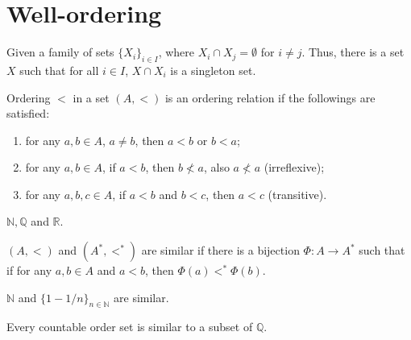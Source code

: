 \section{Well-ordering}
\begin{theorem}
Given a family of sets $\{X_i\}_{i \in I}$, where $X_i \cap X_j = \emptyset$ for $i \neq j$. Thus, there is a set $X$ such that for all $i \in I$, $X \cap X_i$ is a singleton set.
\end{theorem}

\medskip

\begin{definition}
Ordering $<$ in a set $(A, <)$ is an ordering relation if the followings are satisfied:
\begin{enumerate}[label=(\alph*)]
    \item for any $a, b \in A$, $a \neq b$, then $a < b$ or $b < a$;
    
    \item for any $a, b \in A$, if $a < b$, then $b \nless a$, also $a \nless a$ (irreflexive);
    
    \item for any $a, b, c \in A$, if $a < b$ and $b < c$, then $a < c$ (transitive).
\end{enumerate}
\end{definition}

\medskip

\begin{example}
$\mathbb{N}, \mathbb{Q}$ and $\mathbb{R}$.
\end{example}

\medskip

\begin{definition}
$(A, <)$ and $(A^*, <^*)$ are similar if there is a bijection $\Phi: A \to A^*$ such that if for any $a, b \in A$ and $a < b$, then $\Phi(a) <^* \Phi(b)$.
\end{definition}

\medskip

\begin{example}
$\mathbb{N}$ and $\{1 - 1/n\}_{n \in \mathbb{N}}$ are similar.
\end{example}

\medskip

\begin{theorem}
Every countable order set is similar to a subset of $\mathbb{Q}$.
\end{theorem}

\medskip

